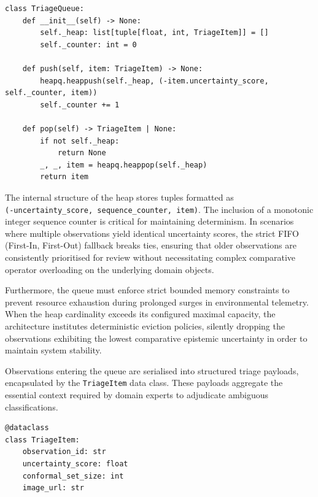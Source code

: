 \begin{listing}[htbp]
\begin{verbatim}
class TriageQueue:
    def __init__(self) -> None:
        self._heap: list[tuple[float, int, TriageItem]] = []
        self._counter: int = 0

    def push(self, item: TriageItem) -> None:
        heapq.heappush(self._heap, (-item.uncertainty_score, self._counter, item))
        self._counter += 1

    def pop(self) -> TriageItem | None:
        if not self._heap:
            return None
        _, _, item = heapq.heappop(self._heap)
        return item
\end{verbatim}
\caption{Binary max-heap implementation of the active learning triage queue.}
\label{lst:triage_queue}
\end{listing}

The internal structure of the heap stores tuples formatted as\\\texttt{(-uncertainty\_score, sequence\_counter, item)}. The inclusion of a monotonic integer sequence counter is critical for maintaining determinism. In scenarios where multiple observations yield identical uncertainty scores, the strict FIFO (First-In, First-Out) fallback breaks ties, ensuring that older observations are consistently prioritised for review without necessitating complex comparative operator overloading on the underlying domain objects.

Furthermore, the queue must enforce strict bounded memory constraints to prevent resource exhaustion during prolonged surges in environmental telemetry. When the heap cardinality exceeds its configured maximal capacity, the architecture institutes deterministic eviction policies, silently dropping the observations exhibiting the lowest comparative epistemic uncertainty in order to maintain system stability.

Observations entering the queue are serialised into structured triage payloads, encapsulated by the \texttt{TriageItem} data class. These payloads aggregate the essential context required by domain experts to adjudicate ambiguous classifications.

\begin{listing}[htbp]
\begin{verbatim}
@dataclass
class TriageItem:
    observation_id: str
    uncertainty_score: float
    conformal_set_size: int
    image_url: str
\end{verbatim}
\caption{Structured payload definition for prioritised taxonomic review.}
\label{lst:triage_item}
\end{listing}

